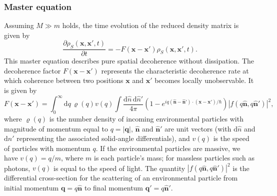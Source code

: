 \documentclass[3p,sort&compress]{elsarticle}
\providecommand{\abs}[1]{\left\lvert#1\right\rvert}
\newcommand{\D}{\ensuremath{\mathrm{d}}}
\newcommand{\E}{\ensuremath{e}}
\newcommand{\I}{\ensuremath{i}}
\renewcommand{\vec}[1]{\ensuremath{\mathbf{#1}}}
\begin{document}
\subsubsection{Master equation}

Assuming $M \gg m$ holds, the time evolution of the reduced density matrix is given by \cite{Joos:1985:iu,Gallis:1990:un,Diosi:1995:um,Hornberger:2003:un,Schlosshauer:2007:un,Hornberger:2009:aq}
%
\begin{equation} 
\label{eq:scatq} 
\frac{\partial \rho_S(\vec{x}, \vec{x}', t)}{\partial t} 
= - F(\vec{x} - \vec{x}') \rho_S(\vec{x}, \vec{x}', t).
\end{equation}
%
This master equation describes pure spatial decoherence without dissipation. The decoherence factor $F(\vec{x} - \vec{x}')$ represents the characteristic decoherence rate at which coherence between two positions $\vec{x}$ and $\vec{x}'$ becomes locally unobservable. It is given by
%
\begin{equation}
\label{eq:scatf}
  F(\vec{x} - \vec{x}') =  \int_0^\infty \D q \,
 \varrho(q) v(q) \int \frac{\D \hat{n}\,\D \hat{n}'}{4\pi}  \left(1- \E^{\I
    q\left(\vec{\hat{n}} - \vec{\hat{n}}'\right) \cdot \left( \vec{x} - \vec{x'}
    \right) /\hbar} \right) \abs{ f(q\vec{\hat{n}}, q\vec{\hat{n}}') }^2,
\end{equation}
%
where $\varrho(q)$ is the number density of incoming environmental particles with magnitude of momentum equal to $q=\abs{\vec{q}}$, $\vec{\hat{n}}$ and $\vec{\hat{n}}'$ are unit vectors (with $\D \hat{n}$ and $\D \hat{n}'$ representing the associated solid-angle differentials), and $v(q)$ is the speed of particles with momentum $q$. If the environmental particles are massive, we have $v(q) = q/m$, where $m$ is each particle's mass; for massless particles such as photons, $v(q)$ is equal to the speed of light. The quantity $\abs{ f(q\vec{\hat{n}},  q\vec{\hat{n}}')}^2$ is the differential cross-section for the scattering of an environmental particle from initial momentum $\vec{q}=q\vec{\hat{n}}$ to final momentum $\vec{q}'=q\vec{\hat{n}}'$.
\end{document}
